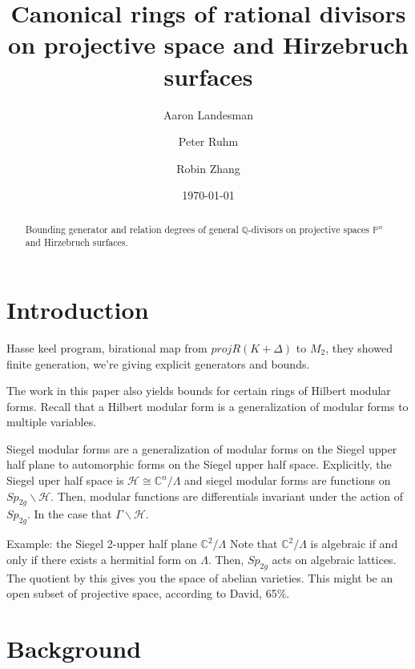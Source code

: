 \documentclass{amsart}
\title{Canonical rings of rational divisors on projective space and Hirzebruch surfaces}
\author{Aaron Landesman}
\author{Peter Ruhm}
\author{Robin Zhang}
\date{\today}
\theoremstyle{plain}
\theoremstyle{definition}
\theoremstyle{remark}
\numberwithin{equation}{section}
\newcommand\bc{{\mathbb C}}
\newcommand\bq{{\mathbb Q}}
\newcommand\bp{{\mathbb P}}
\begin{document}
\begin{abstract}
 	Bounding generator and relation degrees of general $\bq$-divisors
	on projective spaces $\bp^n$ and Hirzebruch surfaces.
\end{abstract}

\maketitle


\section{Introduction}



Hasse keel program, birational map from $proj R(K + \Delta)$ to $M_2$, they showed finite generation, we're giving explicit generators and bounds.

The work in this paper also yields bounds for certain rings of Hilbert modular forms. Recall that a Hilbert modular form is a generalization of modular forms to multiple variables.

Siegel modular forms are a generalization of modular forms on the Siegel upper half plane to automorphic forms on the Siegel upper half space. Explicitly, the Siegel uper half space is $\mathscr H \cong \bc^n/\Lambda$ and siegel modular forms are functions on $Sp_{2g} \backslash \mathscr H.$ Then, modular functions are differentials invariant under the action of $Sp_{2g}$. In the case that $\Gamma \backslash \mathscr H$.

Example: the Siegel 2-upper half plane $\bc^2/\Lambda$ Note that $\bc^2/\Lambda$ is algebraic if and only if there exists a hermitial form on $\Lambda$. Then, $Sp_{2g}$ acts on algebraic lattices. The quotient by this gives you the space of abelian varieties. This might be an open subset of projective space, according to David, 65$\%$.

\section{Background}
\end{document}
